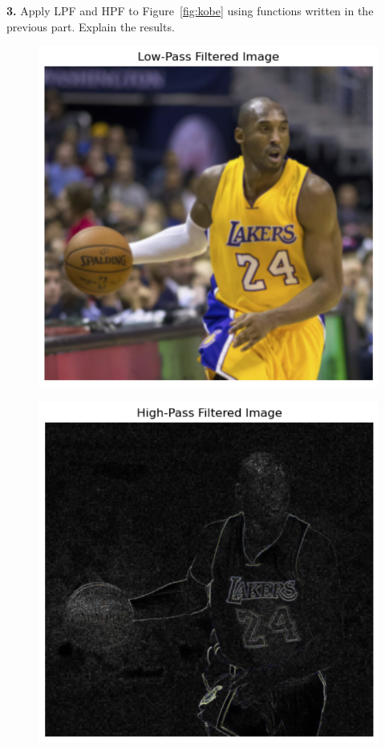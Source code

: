 \documentclass[hidelinks,12pt]{article}
\begin{document}
	\pagebreak
	
	 \textbf{3.} Apply LPF and HPF to Figure~\textcolor{Cyan}{\ref{fig:kobe}} using functions written in the previous part. Explain	the results.
	
	\begin{figure}[hb!]
		\centering
		\includegraphics[scale=0.62]{figures/kobe_lpf.png}
	\end{figure}
	
	\begin{figure}[hb!]
		\centering
		\includegraphics[scale=0.62]{figures/kobe_hpf.png}
	\end{figure}
	
\end{document}
